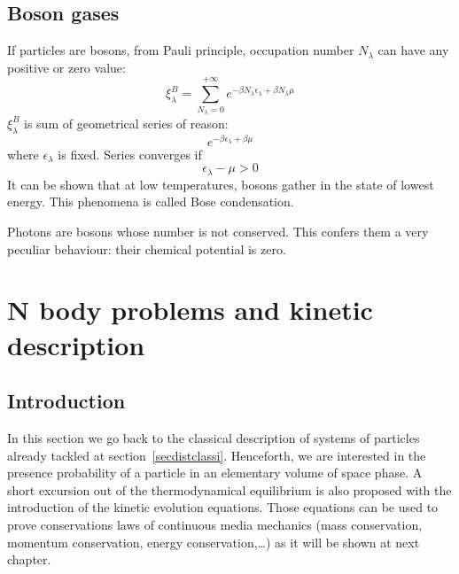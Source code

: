 \documentclass[12pt]{book}
\begin{document}
\subsection{Boson gases}
If particles are bosons, from Pauli principle, occupation number $N_\lambda$
can have any positive or zero value:
\begin{equation}
\xi^B_\lambda= \sum_{N_\lambda=0}^{+\infty}e^{-\beta
N_\lambda\epsilon_\lambda+\beta N_\lambda\mu} 
\end{equation}
$\xi^B_\lambda$ is sum of geometrical series of reason:
\begin{equation}
e^{-\beta \epsilon_\lambda+\beta \mu}
\end{equation}
where $\epsilon_\lambda$ is fixed. Series converges if
\begin{equation}
\epsilon_\lambda-\mu>0
\end{equation}
It can be shown\cite{ph:physt:Diu89} that at low temperatures, bosons gather
in the state of lowest energy. This phenomena is called Bose
condensation. 
\begin{rem}
Photons are bosons whose number is not conserved. This confers them a very
peculiar behaviour: their chemical potential is zero.
\end{rem}


\section{N body problems and kinetic description}\label{desccinet}
\subsection{Introduction}
In this section we go back to the classical description of systems of
particles already tackled at section~\ref{secdistclassi}. Henceforth, we are
interested in the presence probability of a particle in an elementary volume
of space phase. A short excursion out of the thermodynamical equilibrium is
also proposed with the introduction of the kinetic evolution equations.
Those equations can be used to prove conservations laws of continuous media
mechanics (mass conservation, momentum conservation, energy
conservation,\dots) as it will be shown at next chapter.
\end{document}
